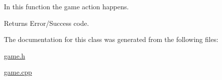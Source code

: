 In this function the game action happens. 

\begin{DoxyReturn}{Returns}
Error/\-Success code. 
\end{DoxyReturn}


The documentation for this class was generated from the following files\-:\begin{DoxyCompactItemize}
\item 
\hyperlink{game_8h}{game.\-h}\item 
\hyperlink{game_8cpp}{game.\-cpp}\end{DoxyCompactItemize}
